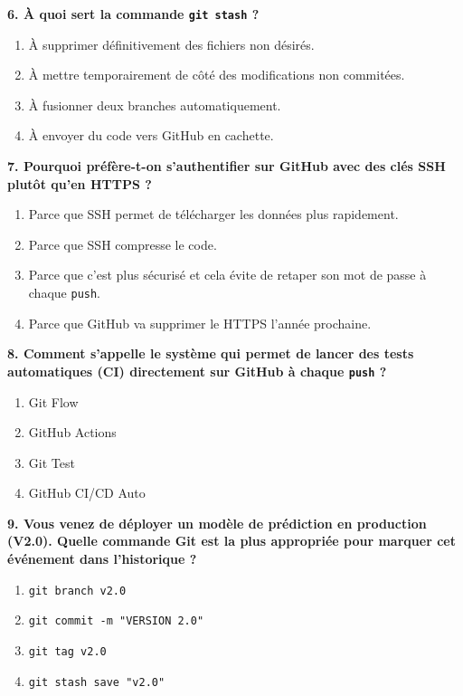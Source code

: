 \documentclass[
  letterpaper,
  DIV=11,
  numbers=noendperiod]{scrreprt}
\providecommand{\tightlist}{%
  \setlength{\itemsep}{0pt}\setlength{\parskip}{0pt}}
\begin{document}
\textbf{6. À quoi sert la commande \texttt{git\ stash} ?}

\begin{enumerate}
\def\labelenumi{\Alph{enumi})}
\tightlist
\item
  À supprimer définitivement des fichiers non désirés.
\item
  À mettre temporairement de côté des modifications non commitées.
\item
  À fusionner deux branches automatiquement.
\item
  À envoyer du code vers GitHub en cachette.
\end{enumerate}

\textbf{7. Pourquoi préfère-t-on s'authentifier sur GitHub avec des clés
SSH plutôt qu'en HTTPS ?}

\begin{enumerate}
\def\labelenumi{\Alph{enumi})}
\tightlist
\item
  Parce que SSH permet de télécharger les données plus rapidement.
\item
  Parce que SSH compresse le code.
\item
  Parce que c'est plus sécurisé et cela évite de retaper son mot de
  passe à chaque \texttt{push}.
\item
  Parce que GitHub va supprimer le HTTPS l'année prochaine.
\end{enumerate}

\textbf{8. Comment s'appelle le système qui permet de lancer des tests
automatiques (CI) directement sur GitHub à chaque \texttt{push} ?}

\begin{enumerate}
\def\labelenumi{\Alph{enumi})}
\tightlist
\item
  Git Flow
\item
  GitHub Actions
\item
  Git Test
\item
  GitHub CI/CD Auto
\end{enumerate}

\textbf{9. Vous venez de déployer un modèle de prédiction en production
(V2.0). Quelle commande Git est la plus appropriée pour marquer cet
événement dans l'historique ?}

\begin{enumerate}
\def\labelenumi{\Alph{enumi})}
\tightlist
\item
  \texttt{git\ branch\ v2.0}
\item
  \texttt{git\ commit\ -m\ "VERSION\ 2.0"}
\item
  \texttt{git\ tag\ v2.0}
\item
  \texttt{git\ stash\ save\ "v2.0"}
\end{enumerate}
\end{document}

